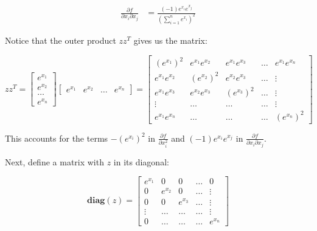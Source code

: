 \documentclass{article}
\begin{document}
\begin{align}
    \frac{\partial f}{\partial x_i \partial x_j} & = \frac{(-1) e^{x_i} e^{x_j}}{\left( \sum_{i=1}^{n} e^{x_i} \right)^2}
\end{align}

Notice that the outer product $ z z^T $ gives us the matrix:

\begin{equation}
    z z^T =
    \begin{bmatrix}
        e^{x_1} \\
        e^{x_2} \\
        \dots   \\
        e^{x_n}
    \end{bmatrix} \begin{bmatrix}
        e^{x_1} &
        e^{x_2} &
        \dots   &
        e^{x_n}
    \end{bmatrix} = \begin{bmatrix}
        (e^{x_1})^2     & e^{x_1} e^{x_2} & e^{x_1} e^{x_3} & \dots & e^{x_1} e^{x_n} \\
        e^{x_1} e^{x_2} & (e^{x_2})^2     & e^{x_2} e^{x_3} & \dots & \vdots          \\
        e^{x_1} e^{x_3} & e^{x_2} e^{x_3} & (e^{x_3})^2     & \dots & \vdots          \\
        \vdots          & \dots           & \dots           & \dots & \vdots          \\
        e^{x_1} e^{x_n} & \dots           & \dots           & \dots & (e^{x_n})^2
    \end{bmatrix}
\end{equation}

This accounts for the terms $- (e^{x_i})^2$ in $\frac{\partial f}{\partial x_i^2}$ and $(-1) e^{x_i} e^{x_j}$ in $\frac{\partial f}{\partial x_i \partial x_j}$.

Next, define a matrix with $z$ in its diagonal:

\begin{equation}
    \bm{diag}(z) = \begin{bmatrix}
        e^{x_1} & 0       & 0       & \dots & 0       \\
        0       & e^{x_2} & 0       & \dots & \vdots  \\
        0       & 0       & e^{x_3} & \dots & \vdots  \\
        \vdots  & \dots   & \dots   & \dots & \vdots  \\
        0       & \dots   & \dots   & \dots & e^{x_n}
    \end{bmatrix}
\end{equation}
\end{document}
